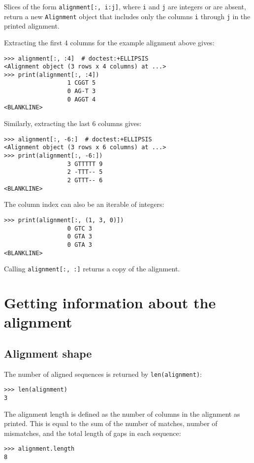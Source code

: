 Slices of the form \verb+alignment[:, i:j]+, where \verb+i+ and \verb+j+ are integers or are absent, return a new \verb+Alignment+ object that includes only the columns \verb+i+ through \verb+j+ in the printed alignment.

Extracting the first 4 columns for the example alignment above gives:
\begin{verbatim}
>>> alignment[:, :4]  # doctest:+ELLIPSIS
<Alignment object (3 rows x 4 columns) at ...>
>>> print(alignment[:, :4])
                  1 CGGT 5
                  0 AG-T 3
                  0 AGGT 4
<BLANKLINE>
\end{verbatim}

Similarly, extracting the last 6 columns gives:
\begin{verbatim}
>>> alignment[:, -6:]  # doctest:+ELLIPSIS
<Alignment object (3 rows x 6 columns) at ...>
>>> print(alignment[:, -6:])
                  3 GTTTTT 9
                  2 -TTT-- 5
                  2 GTTT-- 6
<BLANKLINE>
\end{verbatim}

The column index can also be an iterable of integers:
\begin{verbatim}
>>> print(alignment[:, (1, 3, 0)])
                  0 GTC 3
                  0 GTA 3
                  0 GTA 3
<BLANKLINE>
\end{verbatim}
Calling \verb|alignment[:, :]| returns a copy of the alignment.

\section{Getting information about the alignment}

\subsection{Alignment shape}

The number of aligned sequences is returned by \verb+len(alignment)+:
\begin{verbatim}
>>> len(alignment)
3
\end{verbatim}
The alignment length is defined as the number of columns in the alignment as
printed. This is equal to the sum of the number of matches, number of
mismatches, and the total length of gaps in each sequence:
\begin{verbatim}
>>> alignment.length
8
\end{verbatim}

